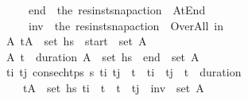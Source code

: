 \begin{isabellebody}
\ \ \ \ \ \ \ \ \ \ \ \ \ \ {\isasympi}\isactrlsub e\isactrlsub n\isactrlsub d\ {\isacharequal}{\kern0pt}\ the\ {\isacharparenleft}{\kern0pt}res{\isacharunderscore}{\kern0pt}inst{\isacharunderscore}{\kern0pt}snap{\isacharunderscore}{\kern0pt}action\ {\isasympi}\ At{\isacharunderscore}{\kern0pt}End{\isacharparenright}{\kern0pt}{\isacharsemicolon}{\kern0pt}\isanewline
\ \ \ \ \ \ \ \ \ \ \ \ \ \ {\isasympi}\isactrlsub i\isactrlsub n\isactrlsub v\ {\isacharequal}{\kern0pt}\ the\ {\isacharparenleft}{\kern0pt}res{\isacharunderscore}{\kern0pt}inst{\isacharunderscore}{\kern0pt}snap{\isacharunderscore}{\kern0pt}action\ {\isasympi}\ Over{\isacharunderscore}{\kern0pt}All{\isacharparenright}{\kern0pt}\ in\isanewline
\ \ \ \ \ \ \ \ \ \ {\isacharparenleft}{\kern0pt}{\isasymexists}A{\isachardot}{\kern0pt}\ {\isacharparenleft}{\kern0pt}t\isactrlsub {\isasympi}{\isacharcomma}{\kern0pt}A{\isacharparenright}{\kern0pt}\ {\isasymin}\ set\ hs\ {\isasymand}\ {\isasympi}\isactrlsub s\isactrlsub t\isactrlsub a\isactrlsub r\isactrlsub t\ {\isasymin}\ set\ A{\isacharparenright}{\kern0pt}\ {\isasymand}\ \isanewline
\ \ \ \ \ \ \ \ \ \ {\isacharparenleft}{\kern0pt}{\isasymexists}A{\isachardot}{\kern0pt}\ {\isacharparenleft}{\kern0pt}t\isactrlsub {\isasympi}\ {\isacharplus}{\kern0pt}\ {\isacharparenleft}{\kern0pt}duration\ {\isasympi}{\isacharparenright}{\kern0pt}{\isacharcomma}{\kern0pt}A{\isacharparenright}{\kern0pt}\ {\isasymin}\ set\ hs\ {\isasymand}\ {\isasympi}\isactrlsub e\isactrlsub n\isactrlsub d\ {\isasymin}\ set\ A{\isacharparenright}{\kern0pt}\ {\isasymand}\ \isanewline
\ \ \ \ \ \ \ \ \ \ {\isacharparenleft}{\kern0pt}{\isasymforall}t\isactrlsub i\ t\isactrlsub j{\isachardot}{\kern0pt}\ {\isacharparenleft}{\kern0pt}consec{\isacharunderscore}{\kern0pt}htps\ {\isasympi}s\ t\isactrlsub i\ t\isactrlsub j\ {\isasymand}\ t\isactrlsub {\isasympi}\ {\isasymle}\ t\isactrlsub i\ {\isasymand}\ t\isactrlsub j\ {\isasymle}\ t\isactrlsub {\isasympi}\ {\isacharplus}{\kern0pt}\ {\isacharparenleft}{\kern0pt}duration\ {\isasympi}{\isacharparenright}{\kern0pt}{\isacharparenright}{\kern0pt}\ \isanewline
\ \ \ \ \ \ \ \ \ \ \ \ {\isasymlongrightarrow}\ {\isacharparenleft}{\kern0pt}{\isasymexists}{\isacharparenleft}{\kern0pt}t{\isacharprime}{\kern0pt}{\isacharcomma}{\kern0pt}A{\isacharparenright}{\kern0pt}\ {\isasymin}\ set\ hs{\isachardot}{\kern0pt}\ t\isactrlsub i\ {\isacharless}{\kern0pt}\ t{\isacharprime}{\kern0pt}\ {\isasymand}\ t{\isacharprime}{\kern0pt}\ {\isacharless}{\kern0pt}\ t\isactrlsub j\ {\isasymand}\ {\isasympi}\isactrlsub i\isactrlsub n\isactrlsub v\ {\isasymin}\ set\ A{\isacharparenright}{\kern0pt}{\isacharparenright}{\kern0pt}{\isacharparenright}{\kern0pt}\isanewline

\end{isabellebody}
